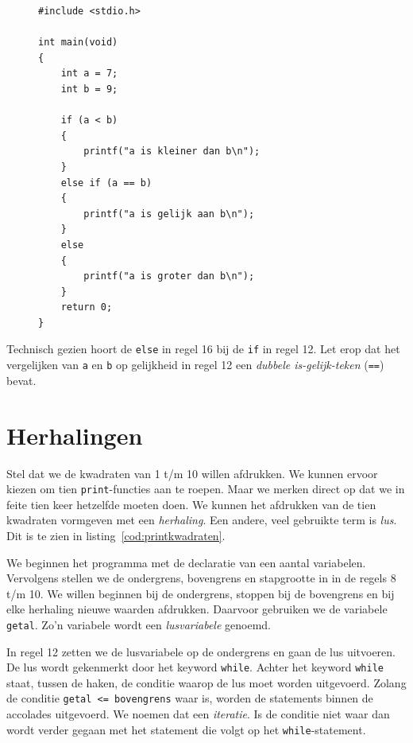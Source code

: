 \begin{figure}[!ht]
\begin{lstlisting}[caption=Afdrukken van tekst op basis van een beslissing.,label=cod:unifelse]
#include <stdio.h>

int main(void)
{
    int a = 7;
    int b = 9;
    
    if (a < b)
    {
        printf("a is kleiner dan b\n");
    }
    else if (a == b) 
    {
        printf("a is gelijk aan b\n");
    }
    else
    {
        printf("a is groter dan b\n");
    }
    return 0;
}
\end{lstlisting}
\end{figure}

Technisch gezien hoort de \texttt{else} in regel 16 bij de \texttt{if} in regel 12. Let erop dat het vergelijken van \texttt{a} en \texttt{b} op gelijkheid in regel 12 een \textsl{dubbele is-gelijk-teken} (\texttt{==})\indexop{==} bevat.

 
\section{Herhalingen}
Stel dat we de kwadraten van 1 t/m 10 willen afdrukken. We kunnen ervoor kiezen om tien \texttt{print}-functies aan te roepen. Maar we merken direct op dat we in feite tien keer hetzelfde moeten doen. We kunnen het afdrukken van de tien kwadraten vormgeven met een \textsl{herhaling}. Een andere, veel gebruikte term is \textsl{lus}. Dit is te zien in listing~\ref{cod:printkwadraten}.

We beginnen het programma met de declaratie van een aantal variabelen. Vervolgens stellen we de ondergrens, bovengrens en stapgrootte in in de regels 8 t/m 10. We willen beginnen bij de ondergrens, stoppen bij de bovengrens en bij elke herhaling nieuwe waarden afdrukken. Daarvoor gebruiken we de variabele \texttt{getal}. Zo'n variabele wordt een \textsl{lusvariabele} genoemd.

In regel 12 zetten we de lusvariabele op de ondergrens en gaan de lus uitvoeren. De lus wordt gekenmerkt door het keyword \texttt{while}. Achter het keyword \texttt{while} staat, tussen de haken, de conditie waarop de lus moet worden uitgevoerd.
Zolang de conditie \mbox{\texttt{getal <= bovengrens}} waar is, worden de statements binnen de accolades uitgevoerd. We noemen dat een \textsl{iteratie}. Is de conditie niet waar dan wordt verder gegaan met het statement die volgt op het \texttt{while}-statement.

